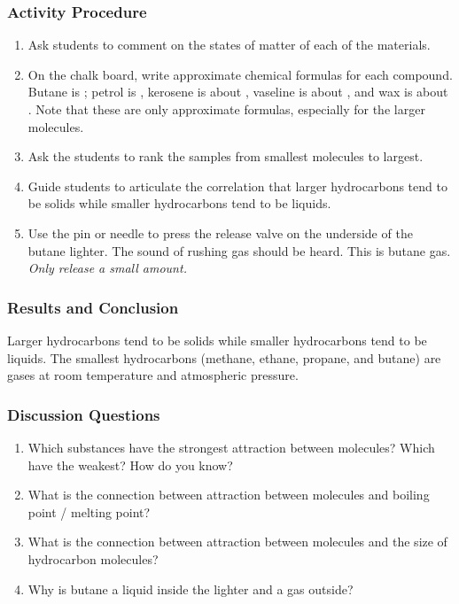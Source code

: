 \subsubsection*{Activity Procedure}
\begin{enumerate}
\item{Ask students to comment on the states of matter of each of the materials.}
\item{On the chalk board, write approximate chemical formulas for each compound. Butane is ; petrol is , kerosene is about , vaseline is about , and wax is about . Note that these are only approximate formulas, especially for the larger molecules.}
\item{Ask the students to rank the samples from smallest molecules to largest.}
\item{Guide students to articulate the correlation that larger hydrocarbons tend to be solids while smaller hydrocarbons tend to be liquids.}
\item{Use the pin or needle to press the release valve on the underside of the butane lighter. The sound of rushing gas should be heard. This is butane gas. \textit{Only release a small amount.}}
\end{enumerate}

\subsubsection*{Results and Conclusion}
Larger hydrocarbons tend to be solids while smaller hydrocarbons tend to be liquids. The smallest hydrocarbons (methane, ethane, propane, and butane) are gases at room temperature and atmospheric pressure.

\subsubsection*{Discussion Questions}
\begin{enumerate}
\item{Which substances have the strongest attraction between molecules? Which have the weakest? How do you know?}
\item{What is the connection between attraction between molecules and boiling point / melting point?}
\item{What is the connection between attraction between molecules and the size of hydrocarbon molecules?}
\item{Why is butane a liquid inside the lighter and a gas outside?}
\end{enumerate}

